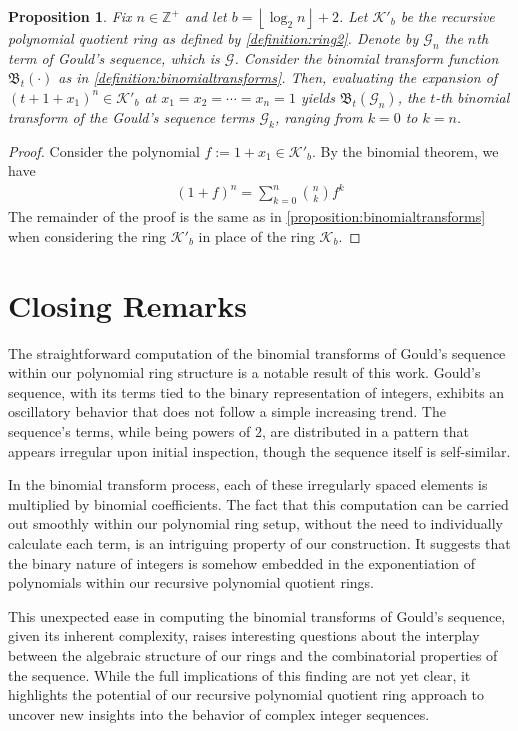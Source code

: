 \documentclass[12pt,reqno]{article}
\theoremstyle{plain}
\newtheorem{proposition}[theorem]{Proposition}
\newcommand{\floor}[1]{\left\lfloor #1 \right\rfloor}
\newcommand{\Z}{\mathbb{Z}}
\newcommand{\K}{\mathcal{K}}
\newcommand{\Ki}{\mathcal{K}'}
\newcommand{\BT}{\mathfrak{B}}
\newcommand{\Goulds}{\mathcal{G}}
\begin{document}
\begin{proposition} \label{proposition:gouldbinomialtransforms}
Fix $n \in \Z^+$ and let $b={\floor{\log_2 n}+2}$. Let $\Ki_b$ be the recursive polynomial quotient ring as defined by \cref{definition:ring2}. Denote by $\Goulds_n$ the $n$th term of Gould's sequence, which is $\Goulds$. Consider the binomial transform function $\BT_t(\cdot)$ as in \cref{definition:binomialtransforms}. Then, evaluating the expansion of $(t + 1 + x_1)^n \in \Ki_b$ at $x_1=x_2=\cdots=x_n=1$ yields $\BT_t(\Goulds_n)$, the $t$-th binomial transform of the Gould's sequence terms $\Goulds_k$, ranging from $k=0$ to $k=n$.
\end{proposition}
\begin{proof}
Consider the polynomial $f := 1 +  x_1 \in \Ki_b$. By the binomial theorem, we have
\begin{align*}
    (1 + f)^n = \sum_{k=0}^{n} \binom{n}{k} f^k
\end{align*}
The remainder of the proof is the same as in \cref{proposition:binomialtransforms} when considering the ring $\Ki_b$ in place of the ring $\K_b$.
\end{proof}

\section{Closing Remarks}
The straightforward computation of the binomial transforms of Gould's sequence within our polynomial ring structure is a notable result of this work. Gould's sequence, with its terms tied to the binary representation of integers, exhibits an oscillatory behavior that does not follow a simple increasing trend. The sequence's terms, while being powers of $2$, are distributed in a pattern that appears irregular upon initial inspection, though the sequence itself is self-similar.

In the binomial transform process, each of these irregularly spaced elements is multiplied by binomial coefficients. The fact that this computation can be carried out smoothly within our polynomial ring setup, without the need to individually calculate each term, is an intriguing property of our construction. It suggests that the binary nature of integers is somehow embedded in the exponentiation of polynomials within our recursive polynomial quotient rings.

This unexpected ease in computing the binomial transforms of Gould's sequence, given its inherent complexity, raises interesting questions about the interplay between the algebraic structure of our rings and the combinatorial properties of the sequence. While the full implications of this finding are not yet clear, it highlights the potential of our recursive polynomial quotient ring approach to uncover new insights into the behavior of complex integer sequences.
\end{document}
